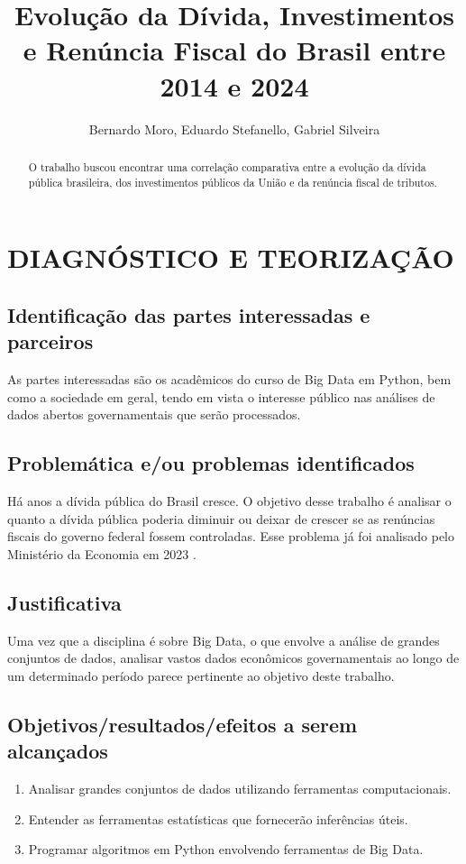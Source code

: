 \documentclass{article}
\title{Evolução da Dívida, Investimentos e Renúncia Fiscal do Brasil entre 2014 e 2024}
\author{Bernardo Moro, Eduardo Stefanello, Gabriel Silveira}
\begin{document}
\maketitle

\begin{abstract}
O trabalho buscou encontrar uma correlação comparativa entre a evolução da dívida pública brasileira, dos investimentos públicos da União e da renúncia fiscal de tributos.
\end{abstract}

\section{DIAGNÓSTICO E TEORIZAÇÃO}

\subsection{Identificação das partes interessadas e parceiros}
As partes interessadas são os acadêmicos do curso de Big Data em Python, bem como a sociedade em geral, tendo em vista o interesse público nas análises de dados abertos governamentais que serão processados.

\subsection{Problemática e/ou problemas identificados}
Há anos a dívida pública do Brasil cresce. O objetivo desse trabalho é analisar o quanto a dívida pública poderia diminuir ou deixar de crescer se as renúncias fiscais do governo federal fossem controladas. Esse problema já foi analisado pelo Ministério da Economia em 2023 \cite{MinEconomia2023}.

\subsection{Justificativa}
Uma vez que a disciplina é sobre Big Data, o que envolve a análise de grandes conjuntos de dados, analisar vastos dados econômicos governamentais ao longo de um determinado período parece pertinente ao objetivo deste trabalho.

\subsection{Objetivos/resultados/efeitos a serem alcançados}
\begin{enumerate}
    \item Analisar grandes conjuntos de dados utilizando ferramentas computacionais.
    \item Entender as ferramentas estatísticas que fornecerão inferências úteis.
    \item Programar algoritmos em Python envolvendo ferramentas de Big Data.
\end{enumerate}
\end{document}
